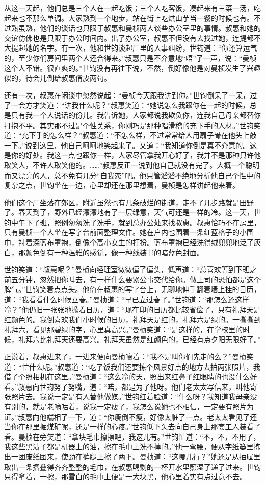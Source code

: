 \par 从这一天起，他们总是三个人在一起吃饭；三个人吃客饭，凑起来有三菜一汤，吃起来也不那么单调。大家熟到一个地步，站在街上吃烘山芋当一餐的时候也有。不过熟虽熟，他们的谈话也只限于叔惠和曼桢两人谈些办公室里的事情。叔惠和她的交谊仿佛也是只限于办公时间内。出了办公室，叔惠不但没有去找过她，连提都不大提起她的名字。有一次，他和世钧谈起厂里的人事纠纷，世钧道：“你还算运气的，至少你们房间里两个人还合得来。”叔惠只是不介意地“唔”了一声，说：“曼桢这个人不错。很直爽的。”世钧没有再往下说，不然，倒好像他是对曼桢发生了兴趣似的，待会儿倒给叔惠俏皮两句。
\par 还有一次，叔惠在闲谈中忽然说起：“曼桢今天跟我讲到你。”世钧倒呆了一呆，过了一会方才笑道：“讲我什么呢？”叔惠笑道：“她说怎么我跟你在一起的时候，总是只有我一个人说话的份儿。我告诉她，人家都说我欺负你，连我自己母亲都替你打抱不平。其实那不过是个性关系，你刚巧是那种唱滑稽的充下手的人材。”世钧笑道：“充下手的怎么样？”叔惠道：“不怎么样，不过常常给人用扇子骨在他头上敲一下。”说到这里，他自己呵呵地笑起来了。又道：“我知道你倒是真不介意的。这是你的好处。我这一点也跟你一样，人家尽管拿我开心好了，我并不是那种只许他取笑人，不许人取笑他的。……”叔惠反正一说到他自己就没有完了。大概一个聪明而又漂亮的人，总不免有几分“自我恋”吧。他只管滔滔不绝地分析他自己个性中的复杂之点，世钧坐在一边，心里却还在那里想着，曼桢是怎样讲起他来着。
\par 他们这个厂坐落在郊区，附近虽然也有几条破烂的街道，走不了几步路就是田野了。春天到了，野外已经濛濛地有了一层绿意，天气可还是一样的冷。这一天，世钧中午下了班，照例匆匆洗了洗手，就到总办公处来找叔惠。叔惠恰巧不在房里，只有曼桢一个人坐在写字台前面整理文件。她在户内也围着一条红蓝格子的小围巾，衬着深蓝布罩袍，倒像个高小女生的打扮。蓝布罩袍已经洗得绒兜兜地泛了灰白，那颜色倒有一种温雅的感觉，像一种线装书的暗蓝色封面。
\par 世钧笑道：“叔惠呢？”曼桢向经理室微微偏了偏头，低声道：“总喜欢等到下班之前五分钟，忽然把你叫去，有一样什么要紧公事交代给你。做上司的恐怕都是这个脾气。”世钧笑着点点头。他倚在叔惠的写字台上，无聊地伸手翻着墙上挂的日历，道：“我看看什么时候立春。”曼桢道：“早已立过春了。”世钧道：“那怎么还这样冷？”他仍旧一张张地掀着日历，道：“现在印的日历都比较省俭了，只有礼拜天是红颜色的。我倒喜欢我们小时候的日历，礼拜天是红的，礼拜六是绿的。一撕撕到礼拜六，看见那碧绿的字，心里真高兴。”曼桢笑道：“是这样的，在学校里的时候，礼拜六比礼拜天还要高兴。礼拜天虽然是红颜色的，已经有点夕阳无限好了。”
\par 正说着，叔惠进来了，一进来便向曼桢嚷着：“我不是叫你们先走的么？”曼桢笑道：“忙什么呢。”叔惠道：“吃了饭我们还要拣个风景好点的地方去拍两张照片，我借了个照相机在这里。”曼桢道：“这么冷的天，照出来红鼻子红眼睛的也没什么好看。”叔惠向世钧努了努嘴，道：“喏，都是为了他呀。他们老太太写信来，叫他寄张照片去。我说一定是有人替他做媒。”世钧红着脸道：“什么呀？我知道我母亲没有别的，就是老嘀咕着，说我一定瘦了，我怎么说她也不相信，一定要有照片为证。”叔惠向他端相了一下，道：“你瘦倒不瘦，好像太脏了一点。老太太看见了还当你在那里掘煤矿呢，还是一样的心疼。”世钧低下头去向自己身上那套工人装看了看。曼桢在旁笑道：“拿块毛巾擦擦吧，我这儿有。”世钧忙道：“不，不，不用了，我这些黑渍子都是机器上的油，擦在毛巾上洗不掉的。”他一弯腰，便从字纸篓里拣出一团废纸团来，使劲在裤腿上擦了两下。曼桢道：“这哪儿行？”她还是从抽屉里取出一条摺叠得齐齐整整的毛巾，在叔惠喝剩的一杯开水里蘸湿了递了过来。世钧只得拿着，一擦，那雪白的毛巾上便是一大块黑，他心里着实有点过意不去。
